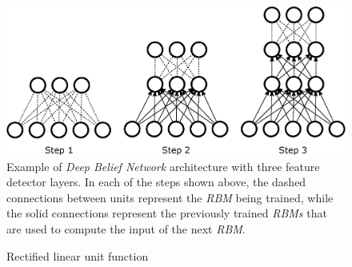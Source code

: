 \begin{figure}
	\centering
	\includegraphics[width=0.7\linewidth]{chapter2/images/dbn}
	\caption{Example of \textit{Deep Belief Network} architecture with three feature detector layers. In each of the steps shown above, the dashed connections between units represent the \textit{RBM} being trained, while the solid connections represent the previously trained \textit{RBMs} that are used to compute the input of the next \textit{RBM}.}
	\label{fig:dbn}
\end{figure}


\begin{figure}
	\centering

	\caption{Rectified linear unit function}
	\label{fig:relu}
\end{figure}

